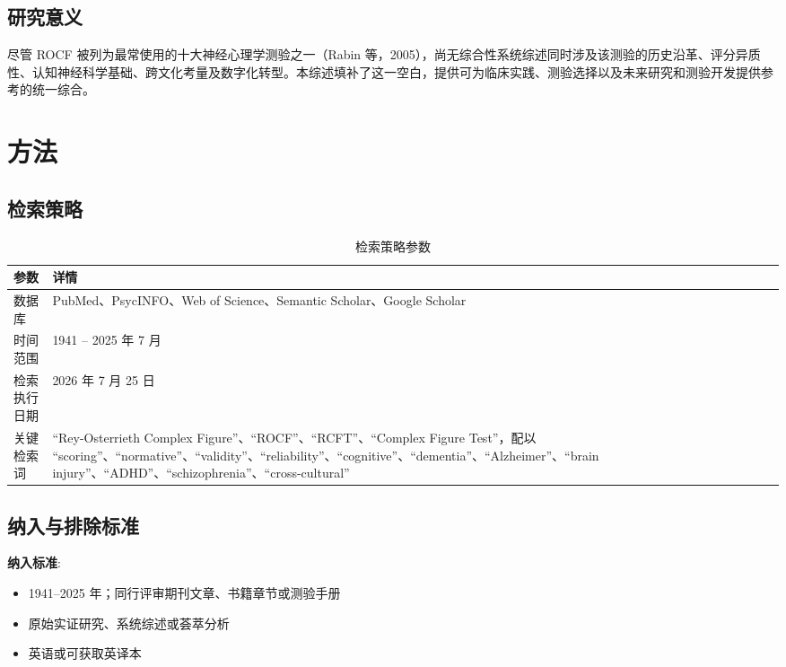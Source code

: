 \documentclass[12pt,a4paper]{ctexart}
\newcommand{\tablefontsize}{\small}
\begin{document}
\subsection{研究意义}

尽管 ROCF 被列为最常使用的十大神经心理学测验之一（Rabin 等，2005），尚无综合性系统综述同时涉及该测验的历史沿革、评分异质性、认知神经科学基础、跨文化考量及数字化转型。本综述填补了这一空白，提供可为临床实践、测验选择以及未来研究和测验开发提供参考的统一综合。

\section{方法}

\subsection{检索策略}

\begin{table}[h!]
\centering
\tablefontsize
\caption{检索策略参数}
\begin{tabular}{p{3cm}p{10cm}}
\toprule
\textbf{参数} & \textbf{详情} \\
\midrule
数据库 & PubMed、PsycINFO、Web of Science、Semantic Scholar、Google Scholar \\
时间范围 & 1941 – 2025 年 7 月 \\
检索执行日期 & 2026 年 7 月 25 日 \\
关键检索词 & ``Rey-Osterrieth Complex Figure''、``ROCF''、``RCFT''、``Complex Figure Test''，配以 ``scoring''、``normative''、``validity''、``reliability''、``cognitive''、``dementia''、``Alzheimer''、``brain injury''、``ADHD''、``schizophrenia''、``cross-cultural'' \\
\bottomrule
\end{tabular}
\end{table}

\subsection{纳入与排除标准}

\textbf{纳入标准}:
\begin{itemize}
\item 1941–2025 年；同行评审期刊文章、书籍章节或测验手册
\item 原始实证研究、系统综述或荟萃分析
\item 英语或可获取英译本
\end{itemize}
\end{document}
